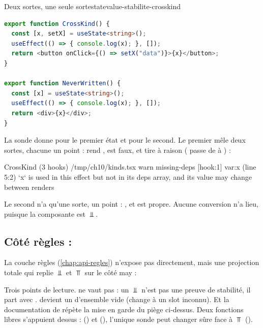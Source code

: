 \begin{exemple}{Deux sortes, une seule sorte}{statevalue-stabilite-crosskind}
\begin{lstlisting}[language=TypeScript,caption={Deux états optionnels (\file{/tmp/ch10/kinds.tsx}, extrait)},label={lst:statevalue-stabilite-crosskind}]
export function CrossKind() {
  const [x, setX] = useState<string>();
  useEffect(() => { console.log(x); }, []);
  return <button onClick={() => setX("data")}>{x}</button>;
}

export function NeverWritten() {
  const [x] = useState<string>();
  useEffect(() => { console.log(x); }, []);
  return <div>{x}</div>;
}
\end{lstlisting}
  La sonde donne  pour le premier état et
   pour le second. Le premier mêle deux sortes, chacune un
  point :  rend ,  est faux,
  et  tire à raison ( passe de  à
  ) :
\begin{sortie}
  CrossKind  (3 hooks)  /tmp/ch10/kinds.tsx
    warn   missing-deps  [hook:1]  var:x  (line 5:2)  `x` is used in this effect but not in its deps array, and its value may change between renders
\end{sortie}
  Le second n'a qu'une sorte, un point : , et 
  est propre. Aucune conversion  n'a lieu, puisque la
  composante  est $\Bot$.
\end{exemple}

\subsection{Côté règles : }

La couche règles (\cref{chap:api-regles}) n'expose pas 
directement, mais une projection totale qui replie $\Bot$ et $\Top$ sur le
côté may :


Trois points de lecture.  ne vaut pas  : un
$\Bot$ n'est pas une preuve de stabilité, il part avec .
 devient un  d'ensemble vide
(\og change à un slot inconnu\fg{}). Et la documentation de 
répète la mise en garde du piège ci-dessus. Deux fonctions libres
s'appuient dessus : 
() et 
(), l'unique sonde \og peut
changer\fg{} sûre face à $\Top$ ().

